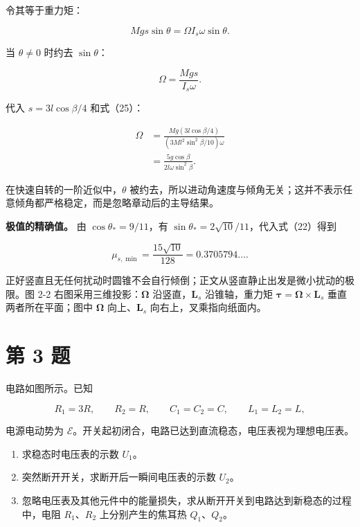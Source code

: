 \documentclass[12pt,a4paper,UTF8]{ctexart}
\newcommand{\tightlist}{\setlength{\itemsep}{0pt}\setlength{\parskip}{0pt}}
\begin{document}
令其等于重力矩：

\[Mgs\sin\theta=\Omega I_s\omega\sin\theta.\]

当 \(\theta\ne0\) 时约去 \(\sin\theta\)：

\[\Omega=\frac{Mgs}{I_s\omega}.\]

代入 \(s=3l\cos\beta/4\) 和式（25）：

\[\begin{aligned}
\Omega
&=\frac{Mg(3l\cos\beta/4)}{(3Ml^2\sin^2\beta/10)\omega}\\
&=\boxed{\frac{5g\cos\beta}{2l\omega\sin^2\beta}}.
\end{aligned} \tag{26}\]

在快速自转的一阶近似中，\(\theta\)
被约去，所以进动角速度与倾角无关；这并不表示任意倾角都严格稳定，而是忽略章动后的主导结果。

\textbf{极值的精确值。} 由 \(\cos\theta_*=9/11\)，有
\(\sin\theta_*=2\sqrt{10}/11\)，代入式（22）得到

\[\mu_{s,\min}=\frac{15\sqrt{10}}{128}=0.3705794\ldots.\]

正好竖直且无任何扰动时圆锥不会自行倾倒；正文从竖直静止出发是微小扰动的极限。图
2-2 右图采用三维投影：\(\boldsymbol\Omega\) 沿竖直，\(\boldsymbol L_s\)
沿锥轴，重力矩
\(\boldsymbol\tau=\boldsymbol\Omega\times\boldsymbol L_s\)
垂直两者所在平面；图中 \(\boldsymbol\Omega\) 向上、\(\boldsymbol L_s\)
向右上，叉乘指向纸面内。

\newpage

\section{第 3 题}\label{ux7b2c-3-ux9898}

电路如图所示。已知

\[R_1=3R,\qquad R_2=R,\qquad C_1=C_2=C,\qquad L_1=L_2=L,\]

电源电动势为
\(\mathcal E\)。开关起初闭合，电路已达到直流稳态，电压表视为理想电压表。

\begin{enumerate}
\def\labelenumi{\arabic{enumi}.}
\tightlist
\item
  求稳态时电压表的示数 \(U_1\)。
\item
  突然断开开关，求断开后一瞬间电压表的示数 \(U_2\)。
\item
  忽略电压表及其他元件中的能量损失，求从断开开关到电路达到新稳态的过程中，电阻
  \(R_1\)、\(R_2\) 上分别产生的焦耳热 \(Q_1\)、\(Q_2\)。
\end{enumerate}
\end{document}
